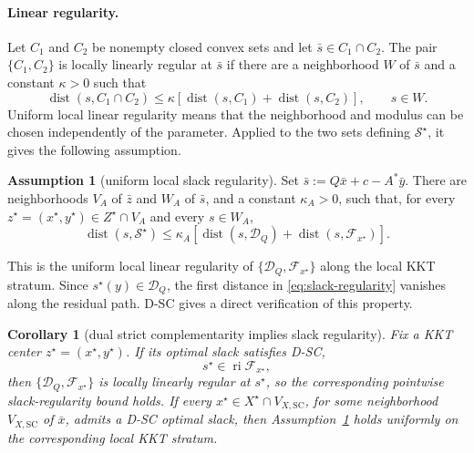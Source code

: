 \documentclass[letterpaper]{article} %
\newtheorem{corollary}[theorem]{Corollary}
\theoremstyle{definition}
\newtheorem{assumption}[theorem]{Assumption}
\theoremstyle{remark}
\begin{document}
\paragraph{Linear regularity.}
Let $C_1$ and $C_2$ be nonempty closed convex sets and let
$\bar s\in C_1\cap C_2$.  The pair $\{C_1,C_2\}$ is locally linearly
regular at $\bar s$ if there are a neighborhood $W$ of $\bar s$ and a
constant $\kappa>0$ such that
\begin{equation}
\label{eq:general-linear-regularity}
    \operatorname{dist}(s,C_1\cap C_2)
    \le
    \kappa\left[
        \operatorname{dist}(s,C_1)+\operatorname{dist}(s,C_2)
    \right],
    \qquad s\in W.
\end{equation}
Uniform local linear regularity means that the neighborhood and modulus can
be chosen independently of the parameter.  Applied to the two sets defining
$\mathcal S^\star$, it gives the following assumption.

\begin{assumption}[uniform local slack regularity]
\label{ass:slack-regularity}
Set $\bar s:=Q\bar x+c-A^*\bar y$.  There are neighborhoods $V_A$ of
$\bar z$ and $W_A$ of $\bar s$, and a constant $\kappa_A>0$, such that,
for every $z^\star=(x^\star,y^\star)\in Z^\star\cap V_A$ and every
$s\in W_A$,
\begin{equation}
\label{eq:slack-regularity}
    \operatorname{dist}(s,\mathcal S^\star)
    \le
    \kappa_A\left[
        \operatorname{dist}(s,\mathcal D_Q)
        +
        \operatorname{dist}(s,\mathcal F_{x^\star})
    \right].
\end{equation}
\end{assumption}

This is the uniform local linear regularity of
$\{\mathcal D_Q,\mathcal F_{x^\star}\}$ along the local KKT stratum.  Since
$s^\star(y)\in\mathcal D_Q$, the first distance in
\eqref{eq:slack-regularity} vanishes along the residual path.  D-SC gives a
direct verification of this property.

\begin{corollary}[dual strict complementarity implies slack regularity]
\label{cor:dual-sc-slack-regularity}
Fix a KKT center $z^\star=(x^\star,y^\star)$.  If its optimal slack satisfies
D-SC,
\begin{equation}
\label{eq:dual-side-strict-complementarity}
    s^\star\in\operatorname{ri}\mathcal F_{x^\star},
\end{equation}
then $\{\mathcal D_Q,\mathcal F_{x^\star}\}$ is locally linearly regular at
$s^\star$,
so the corresponding pointwise slack-regularity bound holds.  If every
$x^\star\in X^\star\cap V_{X,\mathrm{SC}}$, for some neighborhood
$V_{X,\mathrm{SC}}$ of $\bar x$, admits a D-SC optimal slack, then
Assumption~\ref{ass:slack-regularity} holds uniformly on the corresponding
local KKT stratum.
\end{corollary}
\end{document}
